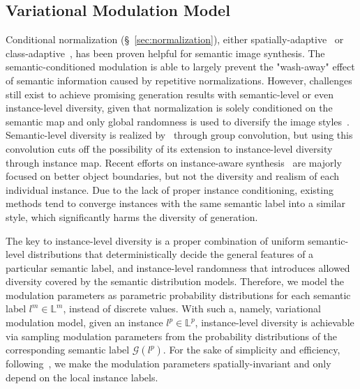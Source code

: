 \documentclass[final]{cvpr}
\begin{document}
\subsection{Variational Modulation Model}
\label{sec:model}
Conditional normalization (\S~\ref{sec:normalization}), either spatially-adaptive~\cite{park2019semantic} or class-adaptive~\cite{tan2020semantic}, has been proven helpful for semantic image synthesis. The semantic-conditioned modulation is able to largely prevent the "wash-away" effect of semantic information caused by repetitive normalizations. However, challenges still exist to achieve promising generation results with semantic-level or even instance-level diversity, given that normalization is solely conditioned on the semantic map and only global randomness is used to diversify the image styles~\cite{park2019semantic}. Semantic-level diversity is realized by~\cite{zhu2020semantically} through group convolution, but using this convolution cuts off the possibility of its extension to instance-level diversity through instance map.
Recent efforts on instance-aware synthesis~\cite{wang2018high,dundar2020panoptic} are majorly focused on better object boundaries, but not the diversity and realism of each individual instance. Due to the lack of proper instance conditioning, existing methods tend to converge instances with the same semantic label into a similar style, which significantly harms the diversity of generation. 

The key to instance-level diversity is a proper combination of uniform semantic-level distributions that deterministically decide the general features of a particular semantic label, and instance-level randomness that introduces allowed diversity covered by the semantic distribution models. Therefore, we model the modulation parameters as parametric probability distributions for each semantic label $l^m\in\mathbb{L}^m$, instead of discrete values. With such a, namely, variational modulation model, given an instance $l^p\in\mathbb{L}^p$, instance-level diversity is achievable via sampling modulation parameters from the probability distributions of the corresponding semantic label $\mathcal{G}(l^p)$. For the sake of simplicity and efficiency, following~\cite{tan2020semantic}, we make the modulation parameters spatially-invariant and only depend on the local instance labels.
\end{document}
